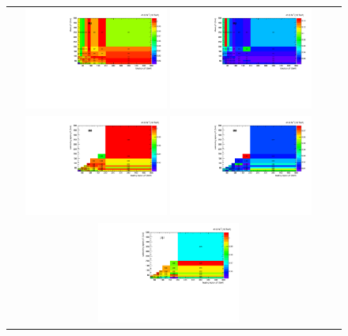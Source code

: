 \begin{figure}[htb]
  \begin{center}
    \begin{tabular}{cc}
      \includegraphics[width=0.45\textwidth]{fig_2017_TrigSF/h2D_lepABpt_emu.pdf}
      \includegraphics[width=0.45\textwidth]{fig_2017_TrigSF/h2D_lepABpt_emu_BinErrors.pdf}\\       
      \includegraphics[width=0.45\textwidth]{fig_2017_TrigSF/h2D_lepABpt_ee.pdf}
      \includegraphics[width=0.45\textwidth]{fig_2017_TrigSF/h2D_lepABpt_ee_BinErrors.pdf}\\
      \includegraphics[width=0.45\textwidth]{fig_2017_TrigSF/h2D_lepABpt_mumu.pdf}

\end{tabular}
\end{center}
\end{figure}
